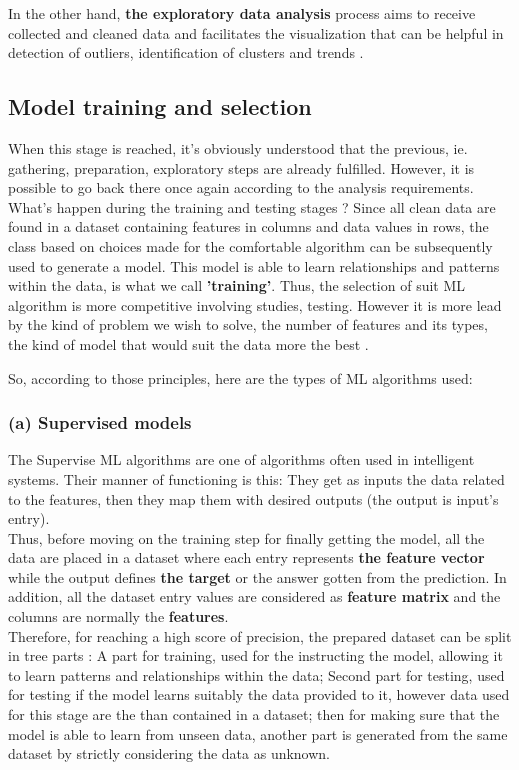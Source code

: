 \documentclass[12pt,a4paper, oneside]{book}
\begin{document}
In the other hand,\textbf{ the exploratory data analysis} process aims to receive collected and cleaned data and facilitates the visualization that can be helpful in detection of outliers, identification of clusters and trends \citep{unwin2020data}. 
\subsection{Model training and selection}
When this stage is reached, it's obviously understood that the previous, ie. gathering, preparation, exploratory steps are already fulfilled. However, it is possible to go back there once again according to the analysis requirements.
What's happen during the training and testing stages ?
Since all clean data are found in a dataset containing features in columns and data values in rows, the class based on choices made for the comfortable algorithm can be subsequently used to generate a model. This model is able to learn relationships and patterns within the data, is what we call \textbf{'training'}. 
Thus, the selection of suit ML algorithm is more competitive involving studies, testing. However it is more lead by the kind of problem we wish to solve, the number of features and its types, the kind of model that would suit the data more the best \citep{wang2016machine}. 

So, according to those principles, here are the types of ML algorithms used:


\subsubsection{(a) Supervised models}  
The Supervise ML algorithms are one of algorithms often  used in intelligent systems. Their manner of functioning is this: They get as inputs the data related to the features, then they map them  with desired outputs (the output is input's entry). \\

Thus, before moving on the training step for finally getting the model, all the data are placed in a dataset where each entry represents \textbf{the feature vector} while the output defines \textbf{the target} or the answer gotten from the prediction. In addition, all the dataset entry values are considered as \textbf{feature matrix} and the columns are normally the \textbf{features}. \\

Therefore, for reaching a high score of precision, the prepared dataset can be split in tree parts : A part for training, used for the instructing the model, allowing it to learn patterns and relationships within the data; Second part for testing, used for testing if the model learns suitably the data provided to it, however data used for this stage are the than contained in a dataset; then for making sure that the model is able to learn from unseen data, another part is generated from the same dataset by strictly considering the data as unknown. \\
\end{document}
